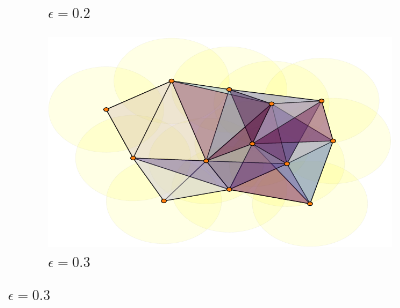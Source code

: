 \documentclass[10pt]{beamer}
\begin{document}
\begin{frame}[fragile]{}
\begin{figure}
\begin{subfigure}[b]{.49\linewidth}
    \caption{$\epsilon=0.2$}
 \end{subfigure}
  \begin{subfigure}[b]{.5\linewidth}
    \includegraphics[scale=.4]{rips_eps=03.pdf}
    \caption{$\epsilon=0.3$}
 \end{subfigure}
\end{figure}
\end{frame}
\end{document}
